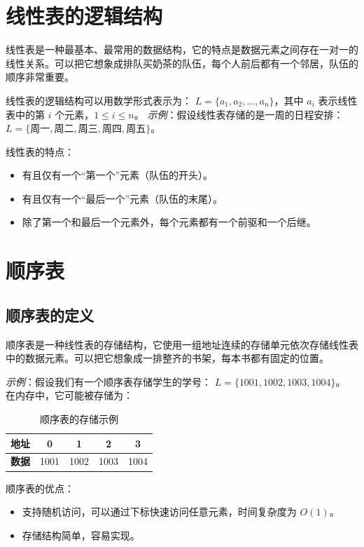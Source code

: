 \documentclass[lang=cn,newtx,10pt,scheme=chinese]{elegantbook}
\begin{document}
\section{线性表的逻辑结构}
线性表是一种最基本、最常用的数据结构，它的特点是数据元素之间存在一对一的线性关系。可以把它想象成排队买奶茶的队伍，每个人前后都有一个邻居，队伍的顺序非常重要。

线性表的逻辑结构可以用数学形式表示为：
$L = \{a_1, a_2, \dots, a_n\}$，其中 $a_i$ 表示线性表中的第 $i$ 个元素，$1 \leq i \leq n$。
\textit{示例}：假设线性表存储的是一周的日程安排：
$L = \{\text{周一}, \text{周二}, \text{周三}, \text{周四}, \text{周五}\}$。

线性表的特点：
\begin{itemize}
    \item 有且仅有一个“第一个”元素（队伍的开头）。
    \item 有且仅有一个“最后一个”元素（队伍的末尾）。
    \item 除了第一个和最后一个元素外，每个元素都有一个前驱和一个后继。
\end{itemize}

\section{顺序表}

\subsection{顺序表的定义}
顺序表是一种线性表的存储结构，它使用一组地址连续的存储单元依次存储线性表中的数据元素。可以把它想象成一排整齐的书架，每本书都有固定的位置。

\textit{示例}：假设我们有一个顺序表存储学生的学号：
$L = \{1001, 1002, 1003, 1004\}$。
在内存中，它可能被存储为：
\begin{table}[h]
  \centering
  \begin{tabular}{|c|c|c|c|c|}
  \hline
  \textbf{地址} & 0 & 1 & 2 & 3 \\
  \hline
  \textbf{数据} & 1001 & 1002 & 1003 & 1004 \\
  \hline
  \end{tabular}
  \caption{顺序表的存储示例}
  \label{tab:sequence_table}
\end{table}
顺序表的优点：
\begin{itemize}
    \item 支持随机访问，可以通过下标快速访问任意元素，时间复杂度为 $O(1)$。
    \item 存储结构简单，容易实现。
\end{itemize}
\end{document}
